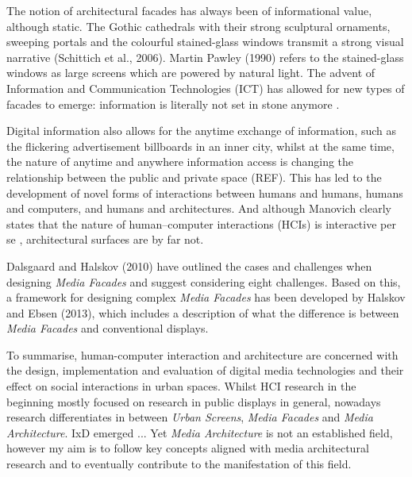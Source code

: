 The notion of architectural facades has always been of informational value, although static. 
The Gothic cathedrals with their strong sculptural ornaments, sweeping portals and the colourful stained-glass windows transmit a strong visual narrative (Schittich et al., 2006). Martin Pawley (1990) refers to the stained-glass windows as large screens which are powered by natural light.
The advent of Information and Communication Technologies (ICT) has allowed for new types of facades to emerge: information is literally not set in stone anymore \cite{Haeussler_2009}.

Digital information also allows for the anytime exchange of information, such as the flickering advertisement billboards in an inner city, whilst at the same time, the nature of anytime and anywhere information access is changing the relationship between the public and private space (REF). This has led to the development of novel forms of interactions between humans and humans, humans and computers, and humans and architectures. And although Manovich clearly states that the nature of human–computer interactions (HCIs) is interactive per se \cite{Manovich_2001}, architectural surfaces are by far not. 

Dalsgaard and Halskov (2010) have outlined the cases and challenges when designing \textit{Media Facades} and suggest considering eight challenges. 
Based on this, a framework for designing complex \textit{Media Facades} has been developed by Halskov and Ebsen (2013), which includes a description of what the difference is between \textit{Media Facades} and conventional displays.
 
To summarise, human-computer interaction and architecture are concerned with the design, implementation and evaluation of digital media technologies and their effect on social interactions in urban spaces. Whilst HCI research in the beginning mostly focused on research in public displays in general, nowadays research differentiates in between \textit{Urban Screens}, \textit{Media Facades} and \textit{Media Architecture}. 
IxD emerged ... 
Yet \textit{Media Architecture} is not an established field, however my aim is to follow key concepts aligned with media architectural research and to eventually contribute to the manifestation of this field. 

